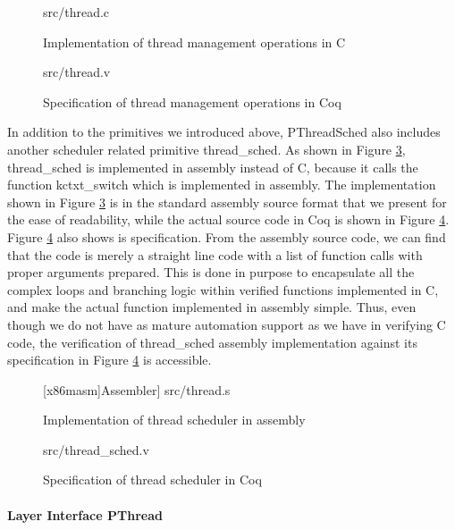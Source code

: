 \begin{figure}
	 {src/thread.c}
	\caption{Implementation of thread management operations in C}
	\label{fig:thread_c}
\end{figure}

\begin{figure}
	 {src/thread.v}
	\caption{Specification of thread management operations in Coq}
	\label{fig:thread_v}
\end{figure}

In addition to the primitives we introduced above, PThreadSched also includes another
scheduler related primitive \textsf{thread\_sched}.
As shown in Figure \ref{fig:thread_s}, \textsf{thread\_sched} is implemented in
assembly instead of C, because it calls the function \textsf{kctxt\_switch} which
is implemented in assembly. The implementation shown in Figure \ref{fig:thread_s}
is in the standard assembly source format that we present for the ease of readability,
while the actual source code in Coq is shown in Figure \ref{fig:thread_sched_v}.
Figure \ref{fig:thread_sched_v} also shows is specification.
From the assembly source code, we can find that the code is merely a straight line
code with a list of function calls with proper arguments prepared. This is done in purpose to
encapsulate all the complex loops and branching logic within verified functions implemented in C,
and make the actual function implemented in assembly simple. Thus, even though we do not
have as mature automation support as we have in verifying C code, the verification of \textsf{thread\_sched}
assembly implementation against its specification in Figure \ref{fig:thread_sched_v} is accessible.

\begin{figure}
	{[x86masm]Assembler}] {src/thread.s}
	\caption{Implementation of thread scheduler in assembly}
	\label{fig:thread_s}
\end{figure}

\begin{figure}
	 {src/thread_sched.v}
	\caption{Specification of thread scheduler in Coq}
	\label{fig:thread_sched_v}
\end{figure}

\paragraph{Layer Interface PThread}

